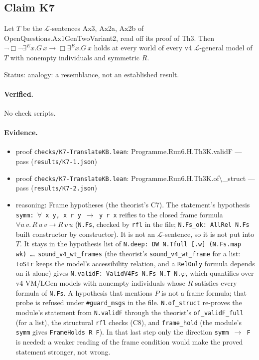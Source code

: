 \documentclass{article}
\begin{document}
\subsection*{Claim K7}

Let $T$ be the $\mathcal L$-sentences Ax3, Ax2a, Ax2b of OpenQuestions.Ax1GenTwoVariant2, read off its proof of Th3. Then $\neg\Box\neg\exists^E x.G\,x\to\Box\exists^E x.G\,x$ holds at every world of every v4 $\mathcal L$-general model of $T$ with nonempty individuals and symmetric $R$.

Status: analogy: a resemblance, not an established result.

\paragraph{Verified.}
No check scripts.

\paragraph{Evidence.}
\begin{itemize}
\item proof \texttt{checks/K7-TranslateKB.lean}: Programme.Run6.H.Th3K.validF --- pass (\texttt{results/K7-1.json})
\item proof \texttt{checks/K7-TranslateKB.lean}: Programme.Run6.H.Th3K.of\textbackslash{}\_struct --- pass (\texttt{results/K7-2.json})
\item reasoning: Frame hypotheses (the theorist's C7). The statement's hypothesis \texttt{symm: $\forall$ x y, x r y $\to$ y r x} reifies to the closed frame formula $\forall u\,v.\,R\,u\,v\to R\,v\,u$ (\texttt{N.Fs}, checked by \texttt{rfl} in the file; \texttt{N.Fs\_ok: AllRel N.Fs} built constructor by constructor). It is not an $\mathcal L$-sentence, so it is not put into $T$. It stays in the hypothesis list of \texttt{N.deep: DW N.Tfull [.w] (N.Fs.map wk) \ldots{}}. \texttt{sound\_v4\_wt\_frames} (the theorist's \texttt{sound\_v4\_wt\_frame} for a list: \texttt{toStr} keeps the model's accessibility relation, and a \texttt{RelOnly} formula depends on it alone) gives \texttt{N.validF: ValidV4Fs N.Fs N.T N.$\varphi$}, which quantifies over v4 VM/LGen models with nonempty individuals whose $R$ satisfies every formula of \texttt{N.Fs}. A hypothesis that mentions $P$ is not a frame formula; that probe is refused under \texttt{\#guard\_msgs} in the file. \texttt{N.of\_struct} re-proves the module's statement from \texttt{N.validF} through the theorist's \texttt{of\_validF\_full} (for a list), the structural \texttt{rfl} checks (C8), and \texttt{frame\_hold} (the module's \texttt{symm} gives \texttt{FrameHolds R F}). In that last step only the direction \texttt{symm $\to$ F} is needed: a weaker reading of the frame condition would make the proved statement stronger, not wrong.
\end{itemize}
\end{document}
